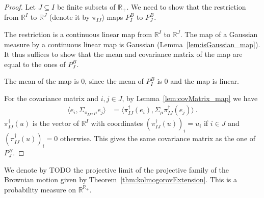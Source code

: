 \begin{proof}
Let $J \subseteq I$ be finite subsets of $\mathbb{R}_+$.
We need to show that the restriction from $\mathbb{R}^I$ to $\mathbb{R}^J$ (denote it by $\pi_{IJ}$) maps $P^B_I$ to $P^B_J$.

The restriction is a continuous linear map from $\mathbb{R}^I$ to $\mathbb{R}^J$.
The map of a Gaussian measure by a continuous linear map is Gaussian (Lemma~\ref{lem:isGaussian_map}).
It thus suffices to show that the mean and covariance matrix of the map are equal to the ones of $P^B_J$.

The mean of the map is $0$, since the mean of $P^B_I$ is $0$ and the map is linear.

For the covariance matrix and $i, j \in J$, by Lemma~\ref{lem:covMatrix_map} we have
\begin{align*}
  \langle e_i, \Sigma_{\pi_{IJ*}\mu} e_j\rangle
  &= \langle \pi_{IJ}^\dagger(e_i), \Sigma_\mu \pi_{IJ}^\dagger(e_j)\rangle
  \: .
\end{align*}
$\pi_{IJ}^\dagger(u)$ is the vector of $\mathbb{R}^I$ with coordinates $(\pi_{IJ}^\dagger(u))_i = u_i$ if $i \in J$ and $(\pi_{IJ}^\dagger(u))_i = 0$ otherwise.
This gives the same covariance matrix as the one of $P^B_J$.
\end{proof}


\begin{definition}\label{def:gaussianLimit}
We denote by TODO the projective limit of the projective family of the Brownian motion given by Theorem~\ref{thm:kolmogorovExtension}.
This is a probability measure on $\mathbb{R}^{\mathbb{R}_+}$.
\end{definition}


